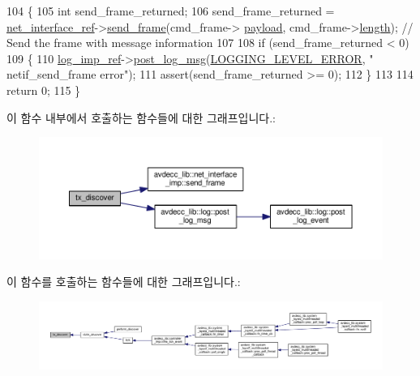 \begin{DoxyCode}
104 \{
105     \textcolor{keywordtype}{int} send\_frame\_returned;
106     send\_frame\_returned = \hyperlink{namespaceavdecc__lib_adb4da03bc65b7846cc240ee919bbde19}{net\_interface\_ref}->\hyperlink{classavdecc__lib_1_1net__interface__imp_ac1a430cb59bcfc3b43ed26b624db5dea}{send\_frame}(cmd\_frame->
      \hyperlink{structjdksavdecc__frame_a220ad076814a31ae0163e722e523de46}{payload}, cmd\_frame->\hyperlink{structjdksavdecc__frame_a1892eba2086d12ac2b09005aeb09ea3b}{length}); \textcolor{comment}{// Send the frame with message information}
107 
108     \textcolor{keywordflow}{if} (send\_frame\_returned < 0)
109     \{
110         \hyperlink{namespaceavdecc__lib_acbe3e2a96ae6524943ca532c87a28529}{log\_imp\_ref}->\hyperlink{classavdecc__lib_1_1log_a68139a6297697e4ccebf36ccfd02e44a}{post\_log\_msg}(\hyperlink{namespaceavdecc__lib_a501055c431e6872ef46f252ad13f85cdaf2c4481208273451a6f5c7bb9770ec8a}{LOGGING\_LEVEL\_ERROR}, \textcolor{stringliteral}{"
      netif\_send\_frame error"});
111         assert(send\_frame\_returned >= 0);
112     \}
113 
114     \textcolor{keywordflow}{return} 0;
115 \}
\end{DoxyCode}


이 함수 내부에서 호출하는 함수들에 대한 그래프입니다.\+:
\nopagebreak
\begin{figure}[H]
\begin{center}
\leavevmode
\includegraphics[width=350pt]{classavdecc__lib_1_1adp__discovery__state__machine_afaadacc9caf0e6254a11fc743f5b635b_cgraph}
\end{center}
\end{figure}




이 함수를 호출하는 함수들에 대한 그래프입니다.\+:
\nopagebreak
\begin{figure}[H]
\begin{center}
\leavevmode
\includegraphics[width=350pt]{classavdecc__lib_1_1adp__discovery__state__machine_afaadacc9caf0e6254a11fc743f5b635b_icgraph}
\end{center}
\end{figure}


